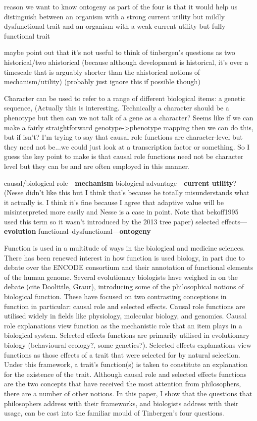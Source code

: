 \documentclass{article}
\begin{document}
reason we want to know ontogeny as part of the four is that it would help us distinguish between an organism with a strong current utility but mildly dysfunctional trait and an organism with a weak current utility but fully functional trait

maybe point out that it's not useful to think of tinbergen's questions as two historical/two ahistorical (because although development is historical, it's over a timescale that is arguably shorter than the ahistorical notions of mechanism/utility) (probably just ignore this if possible though)

Character can be used to refer to a range of different biological items: a genetic sequence,
(Actually this is interesting. Technically a character should be a phenotype but then can we not talk of a gene as a character? Seems like if we can make a fairly straightforward genotype->phenotype mapping then we can do this, but if isn't? I'm trying to say that causal role functions are character-level but they need not be...we could just look at a transcription factor or something. So I guess the key point to make is that causal role functions need not be character level but they can be and are often employed in this manner.

causal/biological role---\textbf{mechanism}
biological advantage---\textbf{current utility}? (Nesse didn't like this but I think that's because he totally misunderstands what it actually is. I think it's fine because I agree that adaptive value will be misinterpreted more easily and Nesse is a case in point. Note that bekoff1995 used this term so it wasn't introduced by the 2013 tree paper)
selected effects---\textbf{evolution}
functional--dysfunctional---\textbf{ontogeny}

Function is used in a multitude of ways in the biological and medicine sciences.
There has been renewed interest in how function is used biology, in part due to debate over the ENCODE consortium and their annotation of functional elements of the human genome.
Several evolutionary biologists have weighed in on the debate (cite Doolittle, Graur), introducing some of the philosophical notions of biological function.
These have focused on two contrasting conceptions in function in particular: causal role and selected effects.
Causal role functions are utilised widely in fields like physiology, molecular biology, and genomics.
Causal role explanations view function as the mechanistic role that an item plays in a biological system.
Selected effects functions are primarily utilised in evolutionary biology (behavioural ecology?, some genetics?).
Selected effects explanations view functions as those effects of a trait that were selected for by natural selection.
Under this framework, a trait's function(s) is taken to constitute an explanation for the existence of the trait.
Although causal role and selected effects functions are the two concepts that have received the most attention from philosophers, there are a number of other notions.
In this paper, I show that the questions that philosophers address with their frameworks, and biologists address with their usage, can be cast into the familiar mould of Tinbergen's four questions.
\end{document}
